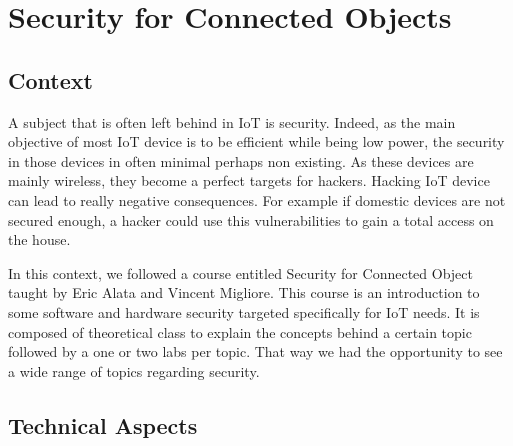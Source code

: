 \section{Security for Connected Objects}

\subsection{Context}

A subject that is often left behind in IoT is security. Indeed, as the main objective of most IoT device is to be efficient while being low power, the security in those devices in often minimal perhaps non existing. As these devices are mainly wireless, they become a perfect targets for hackers. Hacking IoT device can lead to really negative consequences. For example if domestic devices are not secured enough, a hacker could use this vulnerabilities to gain a total access on the house.
\\\par
In this context, we followed a course entitled Security for Connected Object taught by Eric Alata and Vincent Migliore. This course is an introduction to some software and hardware security targeted specifically for IoT needs. It is composed of theoretical class to explain the concepts behind a certain topic followed by a one or two labs per topic. That way we had the opportunity to see a wide range of topics regarding security. 

\subsection{Technical Aspects}

